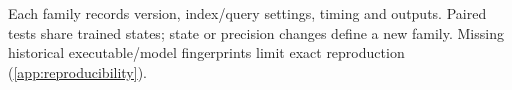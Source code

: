 Each family records version, index/query settings, timing and outputs. Paired tests share trained states; state or precision changes define a new family. Missing historical executable/model fingerprints limit exact reproduction (\cref{app:reproducibility}).